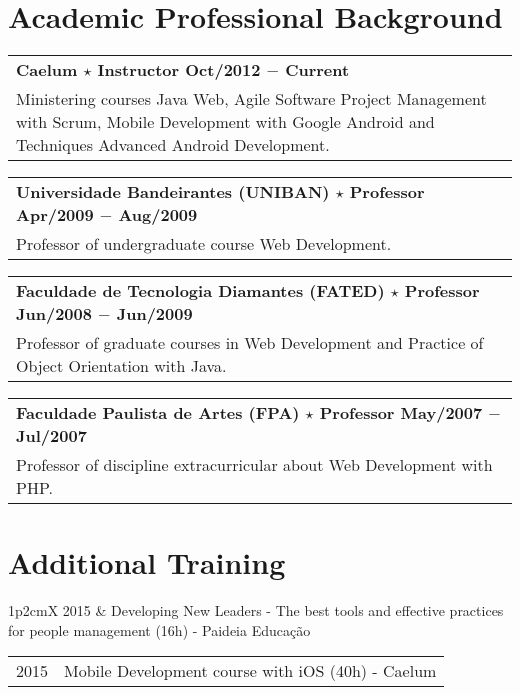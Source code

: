 \documentclass[a4paper, oneside, final]{scrartcl}
\newcommand{\vspc}{\vspace{0.15cm}} %
\newcommand{\vspcitem}{\vspace{0.1cm}} %
\begin{document}
\begin{center}
\section{Academic Professional Background}
\begin{tabularx}{1\linewidth}{X}
{\bf Caelum $\star$ Instructor \hfill Oct/2012 $-$ Current} \\
Ministering courses Java Web, Agile Software Project Management with Scrum, Mobile Development with Google Android and Techniques Advanced Android Development. \vspc\\
\end{tabularx}

\begin{tabularx}{1\linewidth}{X}
{\bf Universidade Bandeirantes (UNIBAN) $\star$ Professor \hfill Apr/2009 $-$ Aug/2009} \\
Professor of undergraduate course Web Development. \vspc\\
\end{tabularx}

\begin{tabularx}{1\linewidth}{X}
{\bf Faculdade de Tecnologia Diamantes (FATED) $\star$ Professor \hfill Jun/2008 $-$ Jun/2009} \\
Professor of graduate courses in Web Development and Practice of Object Orientation with Java. \vspc\\
\end{tabularx}

\begin{tabularx}{1\linewidth}{X}
{\bf Faculdade Paulista de Artes (FPA) $\star$ Professor  \hfill May/2007 $-$ Jul/2007} \\
Professor of discipline extracurricular about Web Development with PHP. \vspc\\
\end{tabularx}

\section{Additional Training}
\begin{tabularx}{1\linewidth}{p{2cm}X}
2015       &  Developing New Leaders - The best tools and effective practices for people management (16h) - Paideia Educação \vspcitem\\
\end{tabularx}

\begin{tabularx}{1\linewidth}{p{2cm}X}
2015       & Mobile Development course with iOS (40h) - Caelum \vspcitem\\
\end{tabularx}


\end{center}
\end{document}
